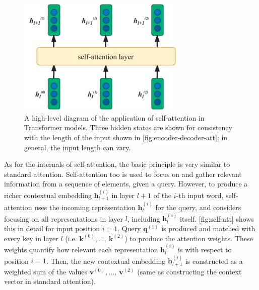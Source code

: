 \documentclass[bsc,frontabs,twoside,singlespacing,parskip,deptreport]{infthesis}
\begin{document}
{{{      \begin{figure}[h!t]
        \centering
        \includegraphics[width=8cm]{graphics/self-att-layer}
        \cprotect\caption{A high-level diagram of the application of self-attention in Transformer models. Three hidden states are shown for consistency with the length of the input shown in \autoref{fig:encoder-decoder-att}; in general, the input length can vary.}
        \label{fig:self-att-layer}
      \end{figure}

      As for the internals of self-attention, the basic principle is very similar to standard attention. Self-attention too is used to focus on and gather relevant information from a sequence of elements, given a query. However, to produce a richer contextual embedding $\bm{h}_{l+1}^{(i)}$ in layer $l+1$ of the $i$-th input word, self-attention uses the incoming representation $\bm{h}_l^{(i)}$ for the query, and considers focusing on all representations in layer $l$, including $\bm{h}_l^{(i)}$ itself. \autoref{fig:self-att} shows this in detail for input position $i=1$. Query $\bm{q}^{(1)}$ is produced and matched with every key in layer $l$ (i.e. $\bm{k}^{(0)},\ldots,\ \bm{k}^{(2)}$) to produce the attention weights. These weights quantify how relevant each representation $\bm{h}_l^{(i)}$ is with respect to position $i=1$. Then, the new contextual embedding $\bm{h}_{l+1}^{(i)}$ is constructed as a weighted sum of the values $\bm{v}^{(0)},\ldots,\ \bm{v}^{(2)}$ (same as constructing the context vector in standard attention).

}}}
\end{document}
